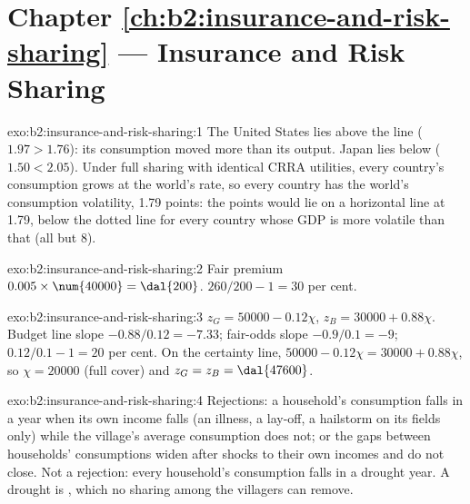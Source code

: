 \section*{Chapter \ref{ch:b2:insurance-and-risk-sharing} --- Insurance and Risk Sharing}

\begin{solution}{exo:b2:insurance-and-risk-sharing:1}
The United States lies above the line ($1.97 > 1.76$): its consumption moved more than its output.
Japan lies below ($1.50 < 2.05$). Under full sharing with identical CRRA utilities, every country's
consumption grows at the world's rate, so every country has the world's consumption volatility, 1.79
points: the points would lie on a horizontal line at 1.79, below the dotted line for every country
whose GDP is more volatile than that (all but 8).
\end{solution}

\begin{solution}{exo:b2:insurance-and-risk-sharing:2}
Fair premium $0.005 \times \num{40000} = \dal{200}$.  $260/200 - 1 = 30$ per cent.
\end{solution}

\begin{solution}{exo:b2:insurance-and-risk-sharing:3}
$z_G = \num{50000} - 0.12\chi$, $z_B = \num{30000} + 0.88\chi$. Budget line slope $-0.88/0.12 = -7.33$;
fair-odds slope $-0.9/0.1 = -9$;  $0.12/0.1 - 1 = 20$ per cent. On the certainty line,
$\num{50000} - 0.12\chi = \num{30000} + 0.88\chi$, so $\chi = \num{20000}$ (full cover) and $z_G = z_B
= \dal{47600}$.
\end{solution}

\begin{solution}{exo:b2:insurance-and-risk-sharing:4}
Rejections: a household's consumption falls in a year when its own income falls (an illness, a
lay-off, a hailstorm on its fields only) while the village's average consumption does not; or the gaps
between households' consumptions widen after shocks to their own incomes and do not close. Not a
rejection: every household's consumption falls in a drought year. A drought is , which
no sharing among the villagers can remove.
\end{solution}


